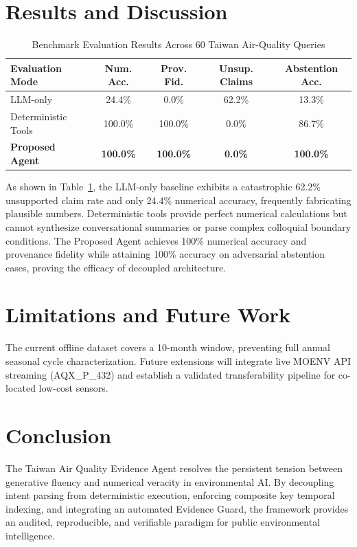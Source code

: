 \documentclass[conference]{IEEEtran}
\begin{document}
\section{Results and Discussion}

\begin{table}[h]
\caption{Benchmark Evaluation Results Across 60 Taiwan Air-Quality Queries}
\label{tab:benchmark_results}
\centering
\begin{tabular}{@{}lcccc@{}}
\toprule
\textbf{Evaluation Mode} & \textbf{Num. Acc.} & \textbf{Prov. Fid.} & \textbf{Unsup. Claims} & \textbf{Abstention Acc.} \\ \midrule
LLM-only & 24.4\% & 0.0\% & 62.2\% & 13.3\% \\
Deterministic Tools & 100.0\% & 100.0\% & 0.0\% & 86.7\% \\
\textbf{Proposed Agent} & \textbf{100.0\%} & \textbf{100.0\%} & \textbf{0.0\%} & \textbf{100.0\%} \\ \bottomrule
\end{tabular}
\end{table}

As shown in Table~\ref{tab:benchmark_results}, the LLM-only baseline exhibits a catastrophic 62.2\% unsupported claim rate and only 24.4\% numerical accuracy, frequently fabricating plausible numbers. Deterministic tools provide perfect numerical calculations but cannot synthesize conversational summaries or parse complex colloquial boundary conditions. The Proposed Agent achieves 100\% numerical accuracy and provenance fidelity while attaining 100\% accuracy on adversarial abstention cases, proving the efficacy of decoupled architecture.

\section{Limitations and Future Work}
The current offline dataset covers a 10-month window, preventing full annual seasonal cycle characterization. Future extensions will integrate live MOENV API streaming (AQX\_P\_432) and establish a validated transferability pipeline for co-located low-cost sensors.

\section{Conclusion}
The Taiwan Air Quality Evidence Agent resolves the persistent tension between generative fluency and numerical veracity in environmental AI. By decoupling intent parsing from deterministic execution, enforcing composite key temporal indexing, and integrating an automated Evidence Guard, the framework provides an audited, reproducible, and verifiable paradigm for public environmental intelligence.



\end{document}
